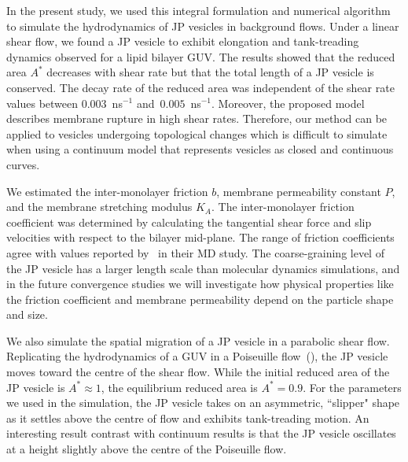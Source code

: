 \documentclass[lineno]{jfm}
\begin{document}
In the present study, we used this integral formulation and numerical
algorithm to simulate the hydrodynamics of JP vesicles in background
flows. Under a linear shear flow, we found a JP vesicle to exhibit
elongation and tank-treading dynamics observed for a lipid bilayer GUV.
%
%
The results showed that the reduced area $A^*$ decreases with shear rate
but that the total length of a JP vesicle is conserved. The decay rate
of the reduced area was independent of the shear rate values between
$0.003$~ns$^{-1}$ and~$0.005$~ns$^{-1}$. Moreover, the proposed model
describes membrane rupture in high shear rates. Therefore, our method
can be applied to vesicles undergoing topological changes which is
difficult to simulate when using a continuum model that represents
vesicles as closed and continuous curves.
%
%

%
%
We estimated the inter-monolayer friction $b$, membrane permeability
constant $P$, and the membrane stretching modulus $K_A$. The
inter-monolayer friction coefficient was determined by calculating the
tangential shear force and slip velocities with respect to the bilayer
mid-plane. The range of friction coefficients agree with values reported
by~\cite{denOtter2007} in their MD study. The coarse-graining level of
the JP vesicle has a larger length scale than molecular dynamics
simulations, and in the future convergence studies we will investigate
how physical properties like the friction coefficient and membrane
permeability depend on the particle shape and size.

We also simulate the spatial migration of a JP vesicle in a parabolic
shear flow. 
%
Replicating the hydrodynamics of a GUV in a Poiseuille
flow~(\cite{Kaoui09, dan-vla-mis2009, cou-kao-pod-mis2008}), the JP
vesicle moves toward the centre of the shear flow. While the initial
reduced area of the JP vesicle is $A^* \approx 1$, the equilibrium
reduced area is $A^*=0.9$. For the parameters we used in the simulation,
the JP vesicle takes on an asymmetric, ``slipper" shape as it settles
above the centre of flow and exhibits tank-treading motion.
An interesting result contrast with continuum results is that the JP
vesicle oscillates at a height slightly above the centre of the
Poiseuille flow. 
\end{document}
